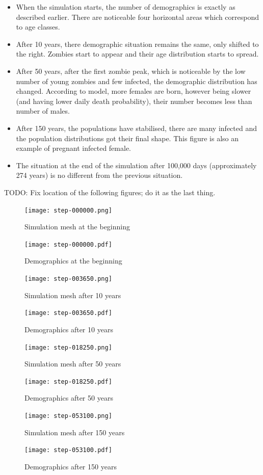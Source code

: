 \documentclass[a4paper]{article}
\newcommand{\todo}[1]{}
\renewcommand{\todo}[1]{{\color{red} TODO: {#1}}}
\begin{document}
\begin{itemize}
\item When the simulation starts, the number of demographics is exactly as described earlier.
    There are noticeable four horizontal areas which correspond to age classes.
\item After 10 years, there demographic situation remains the same, only shifted to the right.
    Zombies start to appear and their age distribution starts to spread.
\item After 50 years, after the first zombie peak, which is noticeable by the low number of young zombies and few infected, the demographic distribution has changed.
    According to model, more females are born, however being slower (and having lower daily death probability), their number becomes less than number of males.
\item After 150 years, the populations have stabilised, there are many infected and the population distributions got their final shape.
    This figure is also an example of pregnant infected female.
\item The situation at the end of the simulation after 100,000 days (approximately 274 years) is no different from the previous situation.
\end{itemize}

\todo{Fix location of the following figures; do it as the last thing.}

\begin{figure}[pht]
    \centering
    \texttt{[image: step-000000.png]}
    \caption{Simulation mesh at the beginning}
    \texttt{[image: step-000000.pdf]}
    \caption{Demographics at the beginning}
\end{figure}

\begin{figure}[pht]
    \centering
    \texttt{[image: step-003650.png]}
    \caption{Simulation mesh after 10 years}
    \texttt{[image: step-003650.pdf]}
    \caption{Demographics after 10 years}
\end{figure}

\begin{figure}[pht]
    \centering
    \texttt{[image: step-018250.png]}
    \caption{Simulation mesh after 50 years}
    \texttt{[image: step-018250.pdf]}
    \caption{Demographics after 50 years}
\end{figure}

\begin{figure}[pht]
    \centering
    \texttt{[image: step-053100.png]}
    \caption{Simulation mesh after 150 years}
    \texttt{[image: step-053100.pdf]}
    \caption{Demographics after 150 years}
\end{figure}
\end{document}
